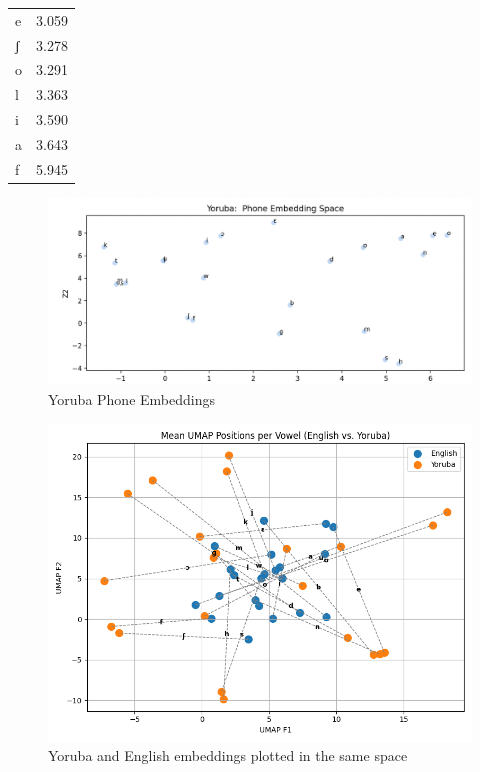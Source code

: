 \documentclass[11pt]{article}
\begin{document}
{\begin{table}
\begin{tabular}{lr}
e & 3.059 \\
ʃ & 3.278 \\
o & 3.291 \\
l & 3.363 \\
i & 3.590 \\
a & 3.643 \\
f & 5.945 \\
\bottomrule
\end{tabular}
\end{table}

\begin{figure}
    \centering
    \includegraphics[width=1\linewidth]{Yoruba_Embeddings.png}
    \caption{Yoruba Phone Embeddings}
    \label{fig:placeholder}
\end{figure}

\begin{figure}
    \centering
    \includegraphics[width=1\linewidth]{yoruba_eng_plot.png}
    \caption{Yoruba and English embeddings plotted in the same space}
    \label{fig:placeholder}
\end{figure}




}
\end{document}
